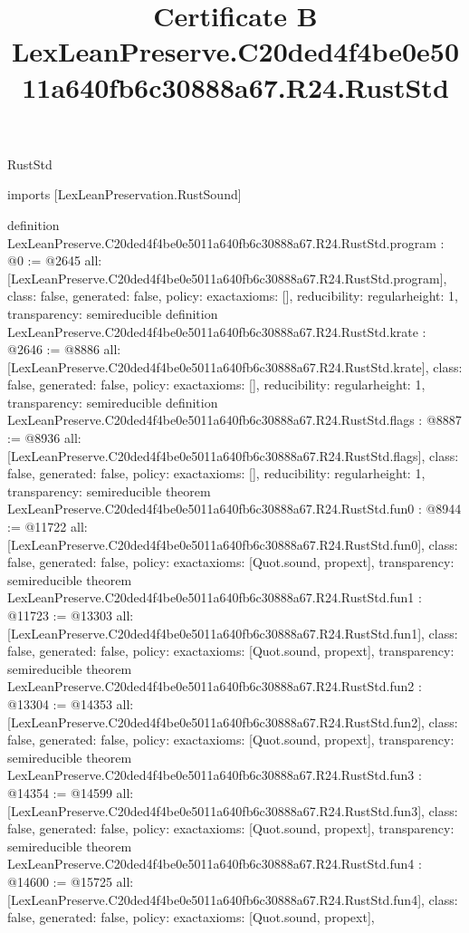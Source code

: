 \begin{lexlean}{RustStd}
\title{Certificate B LexLeanPreserve.C20ded4f4be0e5011a640fb6c30888a67.R24.RustStd}
\begin{coremodule}
imports [LexLeanPreservation.RustSound]

definition LexLeanPreserve.C20ded4f4be0e5011a640fb6c30888a67.R24.RustStd.program : @0 := @2645 {
  all: [LexLeanPreserve.C20ded4f4be0e5011a640fb6c30888a67.R24.RustStd.program],
  class: false,
  generated: false,
  policy: exact{axioms: []},
  reducibility: regular{height: 1},
  transparency: semireducible
}
definition LexLeanPreserve.C20ded4f4be0e5011a640fb6c30888a67.R24.RustStd.krate : @2646 := @8886 {
  all: [LexLeanPreserve.C20ded4f4be0e5011a640fb6c30888a67.R24.RustStd.krate],
  class: false,
  generated: false,
  policy: exact{axioms: []},
  reducibility: regular{height: 1},
  transparency: semireducible
}
definition LexLeanPreserve.C20ded4f4be0e5011a640fb6c30888a67.R24.RustStd.flags : @8887 := @8936 {
  all: [LexLeanPreserve.C20ded4f4be0e5011a640fb6c30888a67.R24.RustStd.flags],
  class: false,
  generated: false,
  policy: exact{axioms: []},
  reducibility: regular{height: 1},
  transparency: semireducible
}
theorem LexLeanPreserve.C20ded4f4be0e5011a640fb6c30888a67.R24.RustStd.fun0 : @8944 := @11722 {
  all: [LexLeanPreserve.C20ded4f4be0e5011a640fb6c30888a67.R24.RustStd.fun0],
  class: false,
  generated: false,
  policy: exact{axioms: [Quot.sound, propext]},
  transparency: semireducible
}
theorem LexLeanPreserve.C20ded4f4be0e5011a640fb6c30888a67.R24.RustStd.fun1 : @11723 := @13303 {
  all: [LexLeanPreserve.C20ded4f4be0e5011a640fb6c30888a67.R24.RustStd.fun1],
  class: false,
  generated: false,
  policy: exact{axioms: [Quot.sound, propext]},
  transparency: semireducible
}
theorem LexLeanPreserve.C20ded4f4be0e5011a640fb6c30888a67.R24.RustStd.fun2 : @13304 := @14353 {
  all: [LexLeanPreserve.C20ded4f4be0e5011a640fb6c30888a67.R24.RustStd.fun2],
  class: false,
  generated: false,
  policy: exact{axioms: [Quot.sound, propext]},
  transparency: semireducible
}
theorem LexLeanPreserve.C20ded4f4be0e5011a640fb6c30888a67.R24.RustStd.fun3 : @14354 := @14599 {
  all: [LexLeanPreserve.C20ded4f4be0e5011a640fb6c30888a67.R24.RustStd.fun3],
  class: false,
  generated: false,
  policy: exact{axioms: [Quot.sound, propext]},
  transparency: semireducible
}
theorem LexLeanPreserve.C20ded4f4be0e5011a640fb6c30888a67.R24.RustStd.fun4 : @14600 := @15725 {
  all: [LexLeanPreserve.C20ded4f4be0e5011a640fb6c30888a67.R24.RustStd.fun4],
  class: false,
  generated: false,
  policy: exact{axioms: [Quot.sound, propext]},
}
\end{coremodule}
\end{lexlean}
